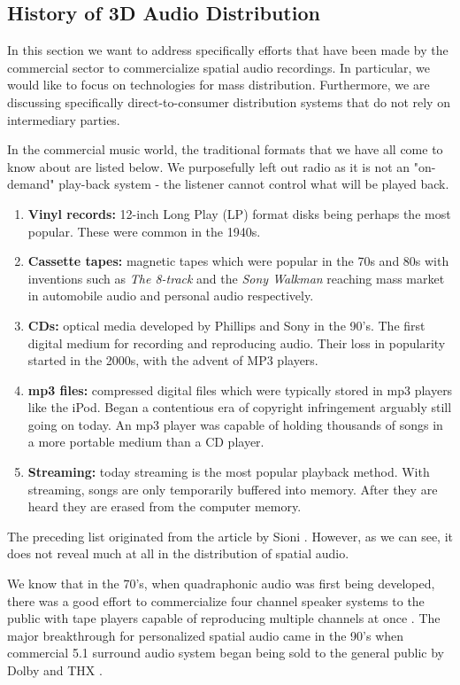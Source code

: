 \subsection{History of 3D Audio Distribution}

In this section we want to address specifically efforts that have been made by the commercial sector to commercialize spatial audio recordings. In particular, we would like to focus on technologies for mass distribution. Furthermore, we are discussing specifically direct-to-consumer distribution systems that do not rely on intermediary parties. 

In the commercial music world, the traditional formats that we have all come to know about are listed below. We purposefully left out radio as it is not an "on-demand" play-back system - the listener cannot control what will be played back.

\begin{enumerate}
    \item \textbf{Vinyl records:} 12-inch Long Play (LP) format disks being perhaps the most popular. These were common in the 1940s. 
    \item \textbf{Cassette tapes:} magnetic tapes which were popular in the 70s and 80s with inventions such as \textit{The 8-track} and the \textit{Sony Walkman} reaching mass market in automobile audio and personal audio respectively.
    \item \textbf{CDs:} optical media developed by Phillips and Sony in the 90's. The first digital medium for recording and reproducing audio. Their loss in popularity started in the 2000s, with the advent of MP3 players.
    \item \textbf{mp3 files:} compressed digital files which were typically stored in mp3 players like the iPod. Began a contentious era of copyright infringement arguably still going on today. An mp3 player was capable of holding thousands of songs in a more portable medium than a CD player. 
    \item \textbf{Streaming:} today streaming is the most popular playback method. With streaming, songs are only temporarily buffered into memory. After they are heard they are erased from the computer memory.
\end{enumerate}

The preceding list originated from the article by Sioni \cite{ABriefHi41online}. However, as we can see, it does not reveal much at all in the distribution of spatial audio. 

We know that in the 70's, when quadraphonic audio was first being developed, there was a good effort to commercialize four channel speaker systems to the public with tape players capable of reproducing multiple channels at once \cite{postrel1990competing}. The major breakthrough for personalized spatial audio came in the 90's when commercial 5.1 surround audio system began being sold to the general public by Dolby and THX \cite{manolas2009enlarging}.

